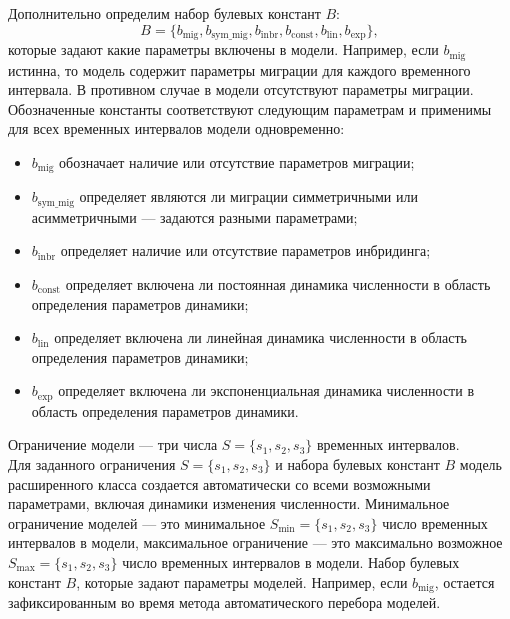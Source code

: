 Дополнительно определим набор булевых констант $B$:
$$B=\{b_\text{mig}, b_\text{sym\_mig}, b_\text{inbr}, b_\text{const}, b_\text{lin}, b_\text{exp}\},$$
которые задают какие параметры включены в модели.
Например, если $b_\text{mig}$ истинна, то модель содержит параметры миграции для каждого временного интервала. В противном случае в модели отсутствуют параметры миграции.
Обозначенные константы соответствуют следующим параметрам и применимы для всех временных интервалов модели одновременно:
\begin{itemize}
    \item $b_\text{mig}$ обозначает наличие или отсутствие параметров миграции;
    \item $b_\text{sym\_mig}$ определяет являются ли миграции симметричными или асимметричными --- задаются разными параметрами;
    \item $b_\text{inbr}$ определяет наличие или отсутствие параметров инбридинга;
    \item $b_\text{const}$ определяет включена ли постоянная динамика численности в область определения параметров динамики;
    \item $b_\text{lin}$ определяет включена ли линейная динамика численности в область определения параметров динамики;
    \item $b_\text{exp}$ определяет включена ли экспоненциальная динамика численности в область определения параметров динамики.
\end{itemize}

 Ограничение модели --- три числа $S=\{s_1, s_2, s_3\}$ временных интервалов.\\

Для заданного ограничения $S=\{s_1, s_2, s_3\}$ и набора булевых констант $B$ модель расширенного класса создается автоматически со всеми возможными параметрами, включая динамики изменения численности.
Минимальное ограничение моделей --- это минимальное $S_{\min}=\{s_1, s_2, s_3\}$ число  временных интервалов в модели, максимальное ограничение --- это максимально возможное $S_{\max}=\{s_1, s_2, s_3\}$ число временных интервалов в модели.
Набор булевых констант $B$, которые задают параметры моделей.
Например, если $b_\text{mig}$, остается зафиксированным во время метода автоматического перебора моделей.

